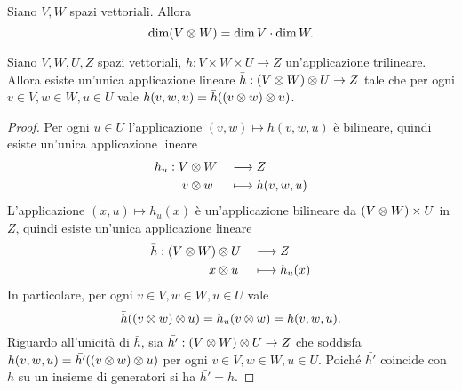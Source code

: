 \begin{corollary}
Siano $V\comma W$ spazi vettoriali. Allora
$$
\dim (V\otimes W)=\dim V\cdot\dim W.
$$
\end{corollary}

\begin{proposition}
Siano $V\comma W\comma U\comma Z$ spazi vettoriali, $h:V\times W\times U\to Z$ un'applicazione trilineare. Allora esiste un'unica applicazione lineare $\bar h:(V\otimes W)\otimes U\to Z$ tale che per ogni $v\in V,w\in W,u\in U$ vale $h(v,w,u)=\bar h((v\otimes w)\otimes u)$.
\end{proposition}
\begin{proof}
Per ogni $u\in U$ l'applicazione $(v,w)\mapsto h(v,w,u)$ è bilineare, quindi esiste un'unica applicazione lineare
\begin{alignat*}{2}
h_u:V&\otimes W&&\longrightarrow Z\\
v&\otimes w&&\longmapsto h(v,w,u)
\end{alignat*}
L'applicazione $(x,u)\mapsto h_u(x)$ è un'applicazione bilineare da $(V\otimes W)\times U$ in $Z$, quindi esiste un'unica applicazione lineare
\begin{alignat*}{3}
\bar h:(V\otimes W)&\otimes U&&\longrightarrow Z\\
x&\otimes u&&\longmapsto h_u(x)
\end{alignat*}
In particolare, per ogni $v\in V,w\in W,u\in U$ vale
$$
\bar h((v\otimes w)\otimes u)=h_u(v\otimes w)=h(v,w,u).
$$
Riguardo all'unicità di $\bar h$, sia $\bar{h'}:(V\otimes W)\otimes U\to Z$ che soddisfa $h(v,w,u)=\bar{h'}((v\otimes w)\otimes u)$ per ogni $v\in V,w\in W,u\in U$. Poiché $\bar{h'}$ coincide con $\bar h$ su un insieme di generatori si ha $\bar{h'}=\bar h$.
\end{proof}

